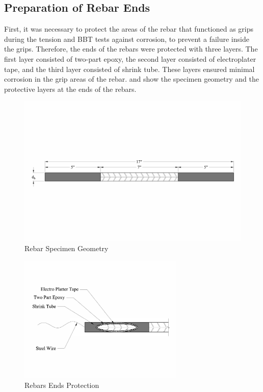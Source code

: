 \subsection{Preparation of Rebar Ends}

First, it was necessary to protect the areas of the rebar that functioned as grips during the tension and BBT tests against corrosion, to prevent a failure inside the grips. Therefore, the ends of the rebars were protected with three layers. The first layer consisted of two-part epoxy, the second layer consisted of electroplater tape, and the third layer consisted of shrink tube. These layers ensured minimal corrosion in the grip areas of the rebar.  and  show the specimen geometry and the protective layers at the ends of the rebars.
\begin{figure}[htbp]
	\centering
	\includegraphics[width=1.0\textwidth]{Chapter-3/figs/RebarSamples}
	\caption{Rebar Specimen Geometry}
	\label{fig:RebarSpecimenGeomtry}
\end{figure}

\begin{figure}[htbp]
	\centering
	\includegraphics[width=0.7\textwidth]{Chapter-3/figs/Rebar_Ends}
	\caption{Rebars Ends Protection}
	\label{fig:RebarEndsProtection}
\end{figure}
\newpage 

